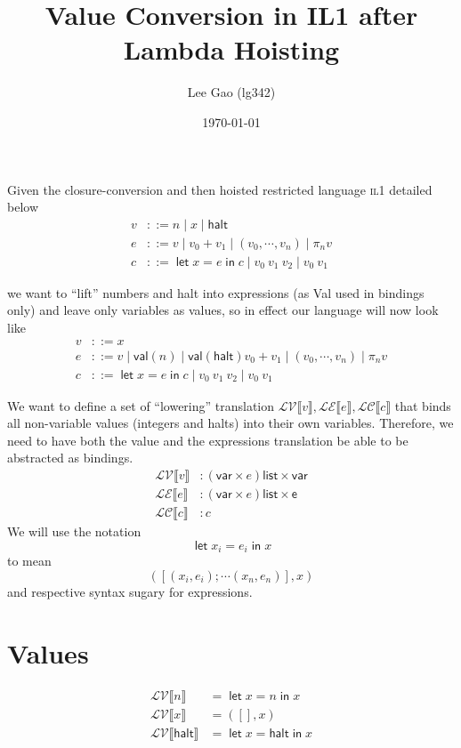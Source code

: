 \documentclass[11pt,a4paper]{article}
\author{Lee Gao (lg342)}
\title{Value Conversion in IL1 after Lambda Hoisting}
\date{\today}
\newcommand {\coo} [1] {\ensuremath{\operatorname{\mathsf{#1}}}}
\newcommand{\Let}[1]{\coo{let} #1 \coo{in} }
\newcommand{\f}[1]{\textsc{#1}}
\newcommand{\g}[1]{\textsf{#1}}
\newcommand{\trans}[2]{\ensuremath{\mathcal{#1}\llbracket #2\rrbracket}}
\begin{document}
\maketitle
\setlength{\parindent}{0pt}

Given the closure-conversion and then hoisted restricted language \f{il1} detailed below
\begin{align*}
v &::= n \mid x \mid \g{halt} \\
e &::= v \mid v_0 + v_1 \mid (v_0,\cdots, v_n) \mid \pi_n v \\
c &::= \Let{x = e}{c} \mid v_0~v_1~v_2 \mid v_0 ~ v_1
\end{align*}

we want to ``lift'' numbers and halt into expressions (as Val used in bindings only) and leave only variables as values, so in effect our language will now look like
\begin{align*}
v &::= x \\
e &::= v \mid \g{val}(n) \mid \g{val}(\g{halt}) v_0 + v_1 \mid (v_0,\cdots, v_n) \mid \pi_n v \\
c &::= \Let{x = e}{c} \mid v_0~v_1~v_2 \mid v_0 ~ v_1
\end{align*}

We want to define a set of ``lowering'' translation $\trans{LV}{v}, \trans{LE}{e}, \trans{LC}{c}$ that binds all non-variable values (integers and halts) into their own variables. Therefore, we need to have both the value and the expressions translation be able to be abstracted as bindings.
\begin{align*}
\trans{LV}{v} &: (\g{var} \times e) \g{list} \times \g{var} \\
\trans{LE}{e} &: (\g{var} \times e) \g{list} \times \g{e} \\
\trans{LC}{c} &: c
\end{align*}
We will use the notation
$$
\Let{x_i = e_i}{x}
$$
to mean
$$
([(x_i,e_i); \cdots (x_n,e_n)],x)
$$
and respective syntax sugary for expressions.

\section{Values}
\begin{align*}
\trans{LV}{n} &= \Let{x = n}{x} \\
\trans{LV}{x} &= ([], x) \\
\trans{LV}{\g{halt}} &= \Let{x = \g{halt}}{x}
\end{align*}
\end{document}
